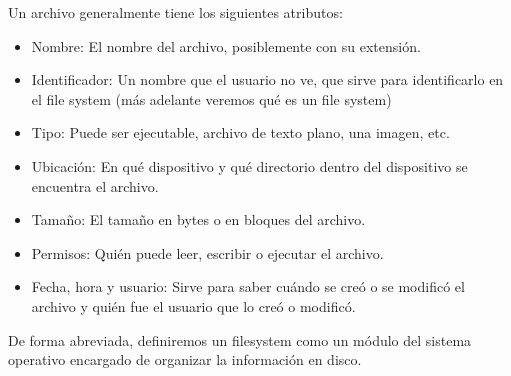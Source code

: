 \documentclass{article}
\begin{document}
Un archivo generalmente tiene los siguientes atributos:

\begin{itemize}
\item Nombre: El nombre del archivo, posiblemente con su extensi\'on.
\item Identificador: Un nombre que el usuario no ve, que sirve para identificarlo en el file system (m\'as adelante veremos qu\'e es un file system)
\item Tipo: Puede ser ejecutable, archivo de texto plano, una imagen, etc.
\item Ubicaci\'on: En qu\'e dispositivo y qu\'e directorio dentro del dispositivo se encuentra el archivo.
\item Tama\~no: El tama\~no en bytes o en bloques del archivo.
\item Permisos: Qui\'en puede leer, escribir o ejecutar el archivo.
\item Fecha, hora y usuario: Sirve para saber cu\'ando se cre\'o o se modific\'o el archivo y qui\'en fue el usuario que lo cre\'o o modific\'o.
\end{itemize}

De forma abreviada, definiremos un filesystem como un módulo del sistema operativo encargado de organizar la información en disco.

% 
\end{document}
